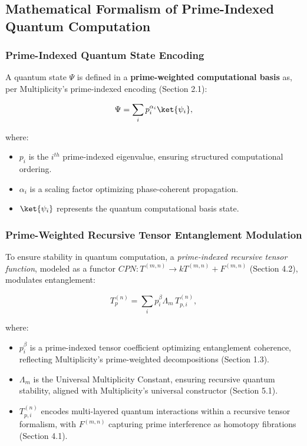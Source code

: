 \documentclass[12pt]{article}
\begin{document}
\subsection{Mathematical Formalism of Prime-Indexed Quantum Computation}

\subsubsection{Prime-Indexed Quantum State Encoding}

A quantum state \(\Psi\) is defined in a \textbf{prime-weighted computational basis} as, per Multiplicity’s prime-indexed encoding (Section 2.1):

\begin{equation}
    \Psi = \sum_{i} p^{\alpha_i}_i \ket{\psi_i},
\end{equation}

where:
\begin{itemize}
    \item \(p_i\) is the \(i^{th}\) prime-indexed eigenvalue, ensuring structured computational ordering.
    \item \(\alpha_i\) is a scaling factor optimizing phase-coherent propagation.
    \item \(\ket{\psi_i}\) represents the quantum computational basis state.
\end{itemize}

\subsubsection{Prime-Weighted Recursive Tensor Entanglement Modulation}

To ensure stability in quantum computation, a \textit{prime-indexed recursive tensor function}, modeled as a functor \(CPN: T^{(m,n)} \to k T^{(m,n)} + F^{(m,n)}\) (Section 4.2), modulates entanglement:

\begin{equation}
    T_p^{(n)} = \sum_{i} p_i^{\beta} \Lambda_m \, T_{p, i}^{(n)},
\end{equation}

where:
\begin{itemize}
    \item \(p_i^{\beta}\) is a prime-indexed tensor coefficient optimizing entanglement coherence, reflecting Multiplicity’s prime-weighted decompositions (Section 1.3).
    \item \(\Lambda_m\) is the Universal Multiplicity Constant, ensuring recursive quantum stability, aligned with Multiplicity’s universal constructor (Section 5.1).
    \item \(T_{p, i}^{(n)}\) encodes multi-layered quantum interactions within a recursive tensor formalism, with \(F^{(m,n)}\) capturing prime interference as homotopy fibrations (Section 4.1).
\end{itemize}
\end{document}

